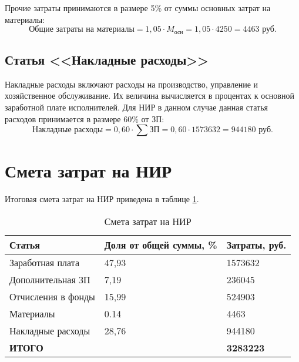 Прочие затраты принимаются в размере 5\% от суммы основных затрат на материалы: $$\text{Общие затраты на материалы} = 1,05 \cdot M_\text{осн} = 1,05 \cdot 4250=4463 \text{ руб.} $$

\subsection{Статья <<Накладные расходы>>}
Накладные расходы включают расходы на производство, управление и хозяйственное обслуживание. Их величина вычисляется в процентах к основной заработной плате исполнителей. Для НИР в данном случае данная статья расходов принимается в размере 60\% от ЗП: $$ \text{Накладные расходы} = 0,60 \cdot \sum \text{ЗП} = 0,60 \cdot 1573632= 944180 \text{ руб}. $$

\clearpage
\section{Смета затрат на НИР}
Итоговая смета затрат на НИР приведена в таблице \ref{tab:econ_result}.

\begin{table}[h]
	\begin{center}
		\caption{Смета затрат на НИР}
		\begin{tabular}{|l|l|l|}
		\hline
Статья & Доля от общей суммы, \% & Затраты, руб. \\ \hline
Заработная плата & 47,93 & 1573632 \\ \hline
Дополнительная ЗП & 7,19 & 236045 \\ \hline
Отчисления в фонды & 15,99 & 524903 \\ \hline
Материалы & 0.14 & 4463 \\ \hline
Накладные расходы & 28,76 & 944180 \\ \hline
 \multicolumn{2}{|p{80mm}|}{\textbf{ИТОГО}} & \textbf{3283223} \\
 \hline
		\end{tabular}
		\label{tab:econ_result}
	\end{center}
\end{table}


